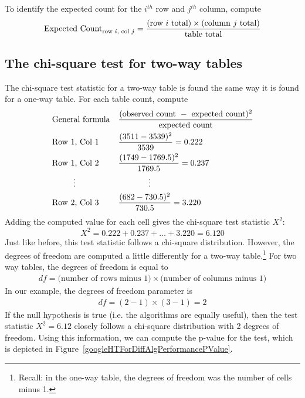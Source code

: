 \begin{termBox}{
To identify the expected count for the $i^{th}$ row and $j^{th}$ column, compute
$$\text{Expected Count}_{\text{row }i,\text{ col }j} = \frac{(\text{row $i$ total}) \times  (\text{column $j$ total})}{\text{table total}}\vspace{2mm}$$}
\end{termBox}


\subsection{The chi-square test for two-way tables}

The chi-square test statistic for a two-way table is found the same way it is found for a one-way table. For each table count, compute
\begin{align*}
&\text{General formula}& &\frac{(\text{observed count } - \text{ expected count})^2}{\text{expected count}} \\
&\text{Row 1, Col 1}& &\frac{(3511 - 3539)^2}{3539} = 0.222 \\
&\text{Row 1, Col 2}& &\frac{(1749 - 1769.5)^2}{1769.5} = 0.237 \\
& \hspace{9mm}\vdots & &\hspace{13mm}\vdots \\
&\text{Row 2, Col 3}& &\frac{(682 - 730.5)^2}{730.5} = 3.220
\end{align*}
Adding the computed value for each cell gives the chi-square test statistic $X^2$:
$$X^2 = 0.222 + 0.237 + \dots + 3.220 = 6.120$$
Just like before, this test statistic follows a chi-square distribution. However, the degrees of freedom are computed a little differently for a two-way table.\footnote{Recall: in the one-way table, the degrees of freedom was the number of cells minus 1.} For two way tables, the degrees of freedom is equal to
\begin{align*}
df = \text{(number of rows minus 1)}\times \text{(number of columns minus 1)}
\end{align*}
In our example, the degrees of freedom parameter is
\begin{align*}
df = (2-1)\times (3-1) = 2
\end{align*}
If the null hypothesis is true (i.e. the algorithms are equally useful), then the test statistic $X^2 = 6.12$ closely follows a chi-square distribution with 2 degrees of freedom. Using this information, we can compute the p-value for the test, which is depicted in Figure~\ref{googleHTForDiffAlgPerformancePValue}.

